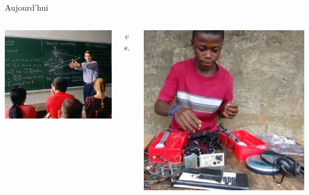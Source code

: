 \begin{frame}{Aujourd'hui}
\begin{columns}
	\begin{column}{0.40\linewidth}
		\centering
		\includegraphics[height=0.35\paperheight]{../resources/illustrations/modern_lecture} \\
	\end{column}
	\begin{column}{0.09\linewidth} \centering \huge \emph vs. \end{column}
	\begin{column}{0.40\linewidth}
		\centering
		\includegraphics[height=0.35\paperheight]{../resources/illustrations/Kelvin-Doe} \\
	\end{column}
\end{columns}
\begin{columns}
	\begin{column}{0.49\linewidth}

\end{column}
\end{columns}
\end{frame}
